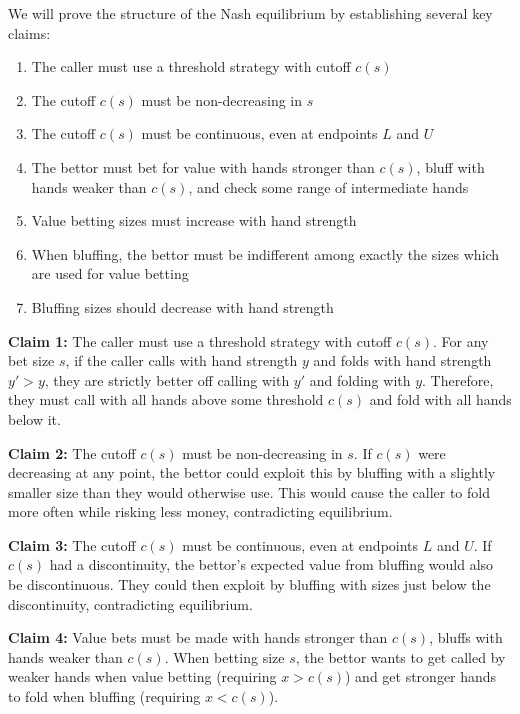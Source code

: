 \documentclass[../../main/main.tex]{subfiles}
\begin{document}
\begin{customproof}
    We will prove the structure of the Nash equilibrium by establishing several key claims:
    \begin{enumerate}
        \item The caller must use a threshold strategy with cutoff $c(s)$
        \item The cutoff $c(s)$ must be non-decreasing in $s$
        \item The cutoff $c(s)$ must be continuous, even at endpoints $L$ and $U$
        \item The bettor must bet for value with hands stronger than $c(s)$, bluff with hands weaker than $c(s)$, and check some range of intermediate hands
        \item Value betting sizes must increase with hand strength
        \item When bluffing, the bettor must be indifferent among exactly the sizes which are used for value betting
        \item Bluffing sizes should decrease with hand strength
    \end{enumerate}

    \textbf{Claim 1:} The caller must use a threshold strategy with cutoff $c(s)$.
    For any bet size $s$, if the caller calls with hand strength $y$ and folds with hand strength $y' > y$, they are strictly better off calling with $y'$ and folding with $y$. Therefore, they must call with all hands above some threshold $c(s)$ and fold with all hands below it.

    \textbf{Claim 2:} The cutoff $c(s)$ must be non-decreasing in $s$.
    If $c(s)$ were decreasing at any point, the bettor could exploit this by bluffing with a slightly smaller size than they would otherwise use. This would cause the caller to fold more often while risking less money, contradicting equilibrium.

    \textbf{Claim 3:} The cutoff $c(s)$ must be continuous, even at endpoints $L$ and $U$.
    If $c(s)$ had a discontinuity, the bettor's expected value from bluffing would also be discontinuous. They could then exploit by bluffing with sizes just below the discontinuity, contradicting equilibrium.

    \textbf{Claim 4:} Value bets must be made with hands stronger than $c(s)$, bluffs with hands weaker than $c(s)$.
    When betting size $s$, the bettor wants to get called by weaker hands when value betting (requiring $x > c(s)$) and get stronger hands to fold when bluffing (requiring $x < c(s)$).


\end{customproof}
\end{document}
